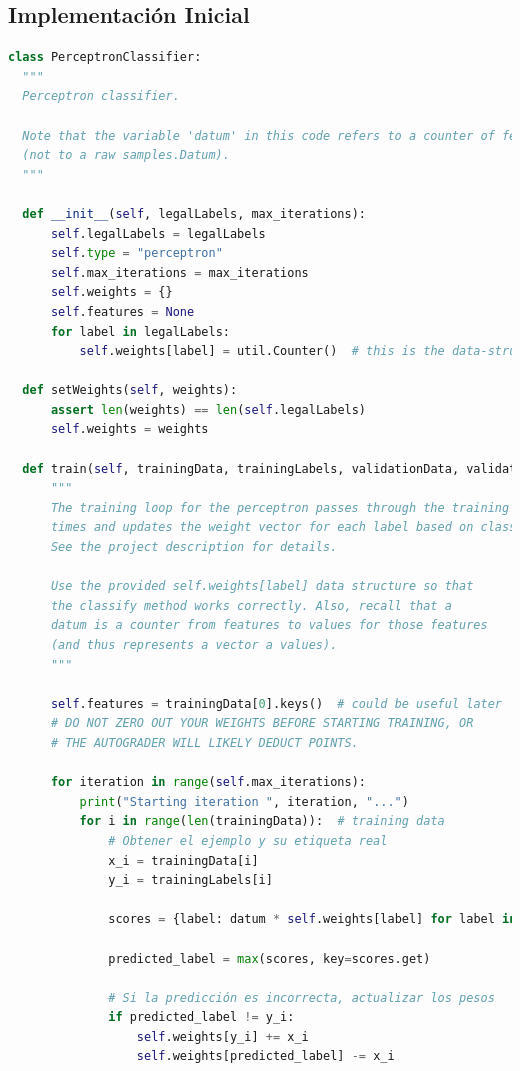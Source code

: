 \documentclass{report}
\begin{document}
      \subsection*{Implementación Inicial}
        \begin{lstlisting}[language=Python, caption=Implementación inicial del perceptron]
class PerceptronClassifier:
  """
  Perceptron classifier.

  Note that the variable 'datum' in this code refers to a counter of features
  (not to a raw samples.Datum).
  """

  def __init__(self, legalLabels, max_iterations):
      self.legalLabels = legalLabels
      self.type = "perceptron"
      self.max_iterations = max_iterations
      self.weights = {}
      self.features = None
      for label in legalLabels:
          self.weights[label] = util.Counter()  # this is the data-structure you should use

  def setWeights(self, weights):
      assert len(weights) == len(self.legalLabels)
      self.weights = weights

  def train(self, trainingData, trainingLabels, validationData, validationLabels):
      """
      The training loop for the perceptron passes through the training data several
      times and updates the weight vector for each label based on classification errors.
      See the project description for details.

      Use the provided self.weights[label] data structure so that
      the classify method works correctly. Also, recall that a
      datum is a counter from features to values for those features
      (and thus represents a vector a values).
      """

      self.features = trainingData[0].keys()  # could be useful later
      # DO NOT ZERO OUT YOUR WEIGHTS BEFORE STARTING TRAINING, OR
      # THE AUTOGRADER WILL LIKELY DEDUCT POINTS.

      for iteration in range(self.max_iterations):
          print("Starting iteration ", iteration, "...")
          for i in range(len(trainingData)):  # training data
              # Obtener el ejemplo y su etiqueta real
              x_i = trainingData[i]
              y_i = trainingLabels[i]

              scores = {label: datum * self.weights[label] for label in self.weights}
              
              predicted_label = max(scores, key=scores.get)

              # Si la predicción es incorrecta, actualizar los pesos
              if predicted_label != y_i:
                  self.weights[y_i] += x_i
                  self.weights[predicted_label] -= x_i


\end{lstlisting}
\end{document}
